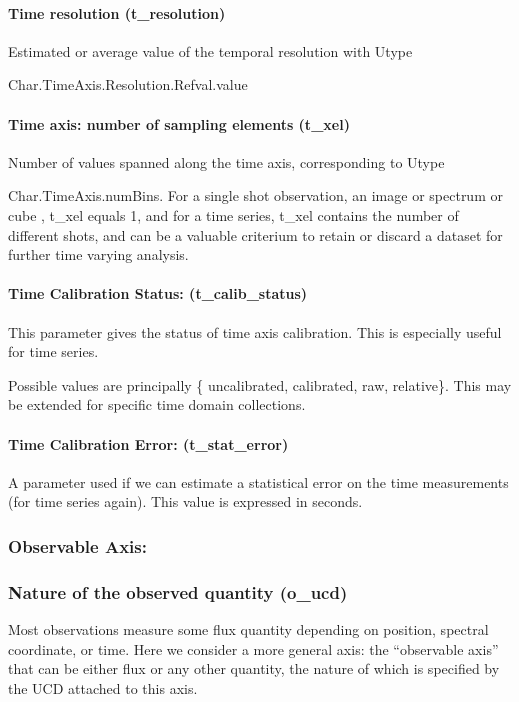 \documentclass[11pt,a4paper]{ivoa}
\begin{document}
\paragraph{Time resolution (t\_resolution)}
Estimated or average value of the temporal resolution with Utype

Char.TimeAxis.Resolution.Refval.value

\paragraph{Time axis: number of sampling elements (t\_xel)}
Number of values spanned along the time axis, corresponding to Utype

Char.TimeAxis.numBins. For a single shot observation, an image or spectrum or cube , t\_xel equals 1, and for a  time
series, t\_xel contains the number of different shots, and can be a valuable criterium to retain or discard a dataset
for further time varying analysis.

\paragraph{Time Calibration Status: (t\_calib\_status)}
This parameter gives the status of time axis calibration. This is especially useful for time series.

Possible values are principally \{ uncalibrated, calibrated, raw, relative\}. This may be extended for specific time
domain collections.

\paragraph{Time Calibration Error: (t\_stat\_error)}
A parameter used if we can estimate a statistical error on the time measurements (for time series again). This value is
expressed in seconds.

\subsubsection{Observable Axis:}
\subsubsection{Nature of the observed quantity (o\_ucd)}
Most observations measure some flux quantity depending on position, spectral coordinate, or time.  Here we consider a
more general axis: the ``observable axis'' that can be either flux or any other quantity, the nature of which is
specified by the UCD attached to this axis.
\end{document}

